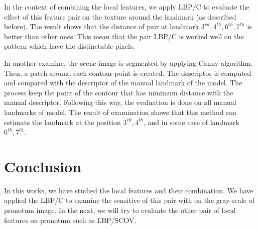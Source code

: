 \documentclass[12pt,a4paper]{article}
\begin{document}
In the context of combining the local features, we apply LBP/C to evaluate the effect of this feature pair on the texture around the landmark (as described before). The result shows that the distance of pair at landmark $3^{rd}, 4^{th}, 6^{th}, 7^{th}$ is better than other ones. This mean that the pair LBP/C is worked well on the pattern which have the distinctable pixels.

In another examine, the scene image is segmented by applying Canny algorithm. Then, a patch around each contour point is created. The descriptor is computed and compared with the descriptor of the manual landmark of the model. The process keep the point of the contour that has minimum distance with the manual descriptor. Following this way, the evaluation is done on all manual landmarks of model. The result of examination shows that this method can estimate the landmark at the position $3^{rd}, 4^{th}$, and in some case of landmark $6^{th}, 7^{th}$.
\section{Conclusion}
In this works, we have studied the local features and their combination. We have applied the LBP/C to examine the sensitive of this pair with on the gray-scale of pronotum image. In the next, we will try to evaluate the other pair of local features on pronotum such as LBP/SCOV.


\end{document}
